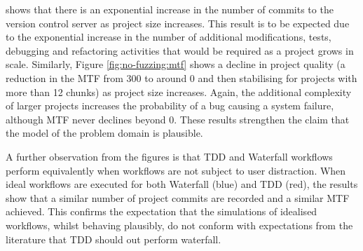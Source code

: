 \documentclass{llncs}
\begin{document}
shows that there is an exponential increase in the number of commits to the version control server as project size
increases.  This result is to be expected due to the exponential increase in the number of additional modifications,
tests, debugging and refactoring activities that would be required as a project grows in scale.  Similarly, Figure
\ref{fig:no-fuzzing:mtf} shows a decline in project quality (a reduction in the MTF from 300 to around 0 and then
stabilising for projects with more than 12 chunks) as project size increases.  Again, the additional complexity of
larger projects increases the probability of a bug causing a system failure, although MTF never declines beyond 0.
These results strengthen the claim that the model of the problem domain is plausible.


A further observation from the figures is that TDD and Waterfall workflows perform equivalently when workflows are not
subject to user distraction.  When ideal workflows are executed for both Waterfall (blue) and TDD (red), the results
show that a similar number of project commits are recorded and a similar MTF achieved.  This confirms the expectation
that the simulations of idealised workflows, whilst behaving plausibly, do not conform with expectations from the
literature that TDD should out perform waterfall.



\end{document}
